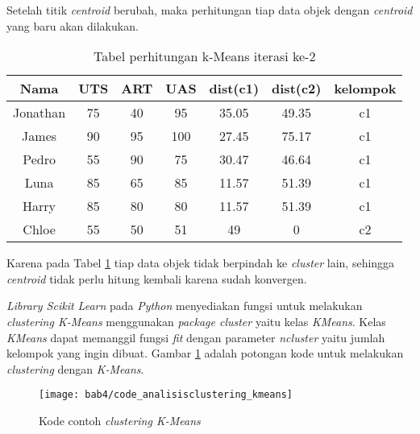 Setelah titik \textit{centroid} berubah, maka perhitungan tiap data objek dengan \textit{centroid} yang baru akan dilakukan.

\begin{table}[H]
\caption{Tabel perhitungan k-Means iterasi ke-2}
\centering
\begin{tabular}{|c|c|c|c|c|c|c|}
\hline 
Nama & UTS & ART & UAS & dist(c1) & dist(c2) & kelompok \\ 
\hline 
Jonathan & 75 & 40 & 95 & 35.05 & 49.35 & c1 \\ 
\hline 
James & 90 & 95 & 100 & 27.45 & 75.17 & c1 \\ 
\hline 
Pedro & 55 & 90 & 75 & 30.47 & 46.64 & c1 \\ 
\hline 
Luna & 85 & 65 & 85 & 11.57 & 51.39 & c1 \\ 
\hline 
Harry & 85 & 80 & 80 & 11.57 & 51.39 & c1 \\ 
\hline 
Chloe & 55 & 50 & 51 & 49 & 0 & c2 \\ 
\hline 
\end{tabular} 
\label{tab:kmeansiterasi2}
\end{table}
Karena pada Tabel \ref{tab:kmeansiterasi2} tiap data objek tidak berpindah ke \textit{cluster} lain, sehingga \textit{centroid} tidak perlu hitung kembali karena sudah konvergen.

\textit{Library Scikit Learn} pada \textit{Python} menyediakan fungsi untuk melakukan \textit{clustering K-Means} menggunakan \textit{package cluster} yaitu kelas \textit{KMeans}. Kelas \textit{KMeans} dapat memanggil fungsi \textit{fit} dengan parameter \textit{n\textunderscore cluster} yaitu jumlah kelompok yang ingin dibuat. Gambar \ref{fig:code_analisisclustering_kmeans} adalah potongan kode untuk melakukan \textit{clustering} dengan \textit{K-Means}.

%
%
%


\begin{figure}[H]
	\centering  
	\texttt{[image: bab4/code\_analisisclustering\_kmeans]}   
	\caption{Kode contoh \textit{clustering K-Means}}
	\label{fig:code_analisisclustering_kmeans} 
\end{figure} 

